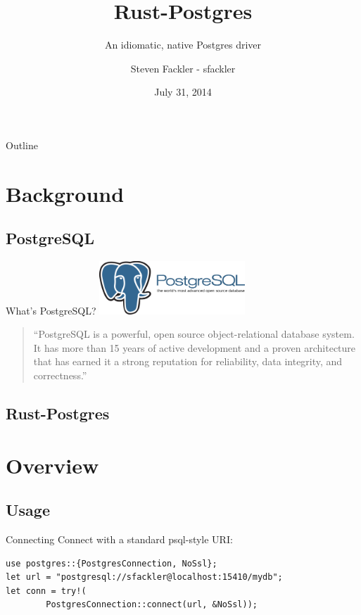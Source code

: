 \documentclass{beamer}
\title{Rust-Postgres}
\subtitle{An idiomatic, native Postgres driver}
\author[sfackler]{Steven Fackler - sfackler}
\date{July 31, 2014}
\begin{document}
\begin{frame}
\titlepage
\end{frame}

\begin{frame}{Outline}
    \tableofcontents
\end{frame}

\section{Background}
\subsection{PostgreSQL}

\begin{frame}{What's PostgreSQL?}
	\includegraphics[height=2cm]{postgres_logo.pdf}

	\begin{quote}
		``PostgreSQL is a powerful, open source object-relational database system. It has more than 15 years of active development and a proven architecture that has earned it a strong reputation for reliability, data integrity, and correctness.''
	\end{quote}
\end{frame}

\subsection{Rust-Postgres}

\section{Overview}
\subsection{Usage}

\begin{frame}[fragile]{Connecting}
	Connect with a standard psql-style URI:
	\begin{verbatim}
use postgres::{PostgresConnection, NoSsl};
let url = "postgresql://sfackler@localhost:15410/mydb";
let conn = try!(
        PostgresConnection::connect(url, &NoSsl));
	\end{verbatim}	
\end{frame}
\end{document}
